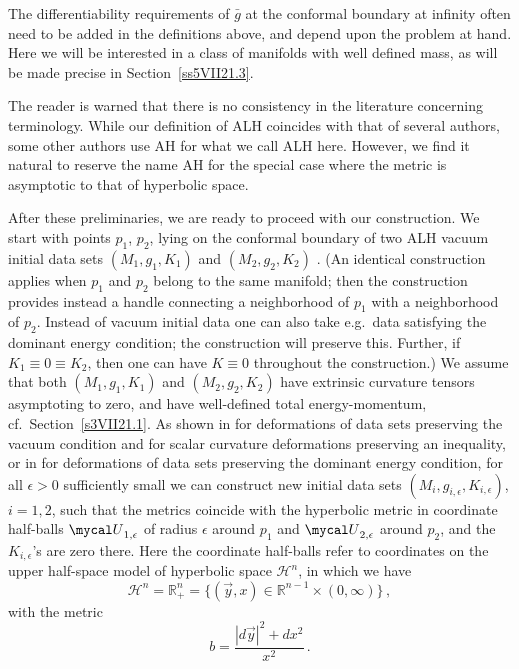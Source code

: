 \documentclass[a4paper,10pt]{article}
\newcommand{\myx}{{\red{x}}}
\newcommand{\myxh}{{\red{\vec y}}}
\newcommand{\myone}{\red{1}}
\newcommand{\mytwo}{\red{2}}
\newcommand{\red}[1]{{\color{red}#1}}
\newcommand{\mcU}{{\mycal U}}
\newcommand{\R}{\mathbb R}
\renewcommand{\red}[1]{#1}%
\begin{document}
      The  differentiability requirements of $\bar g$ at the conformal boundary at infinity  often need to be added in the definitions above, and depend upon the problem at hand. Here we will be interested in a class of manifolds with well defined mass, as will be made precise in Section~\ref{ss5VII21.3}.




      The reader is warned that there is no consistency in the literature concerning terminology. While our definition of ALH coincides with that of several authors, some other authors use AH for what we call ALH here. However, we find it natural to reserve the name AH for the special case where the metric is asymptotic to that of hyperbolic space.


 After these preliminaries, we are ready to proceed with our construction.
      We start with points $p_1$, $p_2$, lying on the conformal boundary of two
      \red{ALH} vacuum initial data sets $(M_1,g_1,K_1)$ and $(M_2,g_2,K_2)$  . (An identical construction applies when $p_1$
      and $p_2$ belong to the same manifold; then the construction provides instead
      a handle connecting a neighborhood of $p_1$ with a neighborhood of $p_2$. Instead of vacuum initial data one can also take e.g.\ data satisfying
      the dominant energy condition; the construction will preserve this. Further, if $K_1\equiv 0 \equiv K_2$, then one can have $K\equiv 0$ throughout the construction.)
       We  assume that both $(M_1, g_1,K_1)$ and $(M_2, g_2,K_2)$ have  extrinsic curvature tensors asymptoting to zero, and  have well-defined total energy-momentum, cf.~Section~\ref{s3VII21.1}.
      As shown in \cite{ChDelayExotic} for deformations of data sets preserving the
      vacuum condition
      and for scalar curvature deformations preserving an
      inequality, or in \cite[Appendix~A]{ChDelayHPETv1}
      for deformations of data sets preserving the dominant energy condition,
       for all $\epsilon>0$ sufficiently small we can construct new initial data sets
      $(M_i, g_{i,\red{\epsilon} },K_{i,\red{\epsilon} })$, $i=1,2$, such
      that the metrics coincide with the hyperbolic metric in coordinate half-balls
      $\mcU_ {\myone,\epsilon }$
       of radius $\epsilon$ around $p_1$ and
      $\mcU_ {\mytwo,\epsilon }$ around $p_2$,
       and the $K_{i,\red{\epsilon}
      }$'s are zero there. Here the coordinate half-balls refer to coordinates on
      the upper half-space model of hyperbolic space ${\mathcal H}^n$,  in which we
      have
      \begin{equation}
       \label{2VI21.5}
       {\mathcal H}^n=\R^n_+=\{(\myxh,\myx)\in\R^{n-1}\times (0,\infty)\}
       \,,
      \end{equation}
      with the metric
      \begin{equation}
       \label{2VI21.6}
      b=\frac{|d \myxh|^2+d\myx^2}{\myx^2}
      \,.
      \end{equation}
\end{document}

